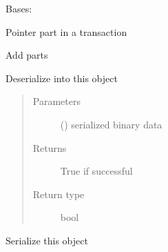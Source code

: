 \documentclass[letterpaper,10pt,english]{sphinxmanual}
\begin{document}

\begin{fulllineitems}
\label{\detokenize{bbc1.core.bbclib:bbc1.core.bbclib.BBcPointer}}
Bases: 

Pointer part in a transaction

\begin{fulllineitems}
\label{\detokenize{bbc1.core.bbclib:bbc1.core.bbclib.BBcPointer.add}}
Add parts

\end{fulllineitems}


\begin{fulllineitems}
\label{\detokenize{bbc1.core.bbclib:bbc1.core.bbclib.BBcPointer.deserialize}}
Deserialize into this object
\begin{quote}\begin{description}
\item[{Parameters}] \leavevmode
{} () \textendash{} serialized binary data

\item[{Returns}] \leavevmode
True if successful

\item[{Return type}] \leavevmode
bool

\end{description}\end{quote}

\end{fulllineitems}


\begin{fulllineitems}
\label{\detokenize{bbc1.core.bbclib:bbc1.core.bbclib.BBcPointer.serialize}}
Serialize this object

\end{fulllineitems}


\end{fulllineitems}
\end{document}
